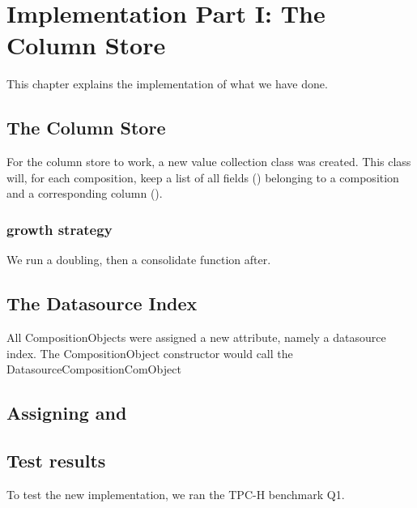 \chapter{Implementation Part I: The Column Store}
\label{chap:Implementation Part I: The Column Store}

This chapter explains the implementation of what we have done.

\section{The Column Store}
\label{sec:The CompositionComObjValueCollection}
For the column store to work, a new value collection class was created. This class will, for each composition, keep a list of all fields () belonging to a composition and a corresponding column ().

\subsection{ growth strategy}
\label{sub:FieldValueCollection growth strategy}
We run a doubling, then a consolidate function after.



\section{The Datasource Index}
\label{sec:The Datasource Index}
All CompositionObjects were assigned a new attribute, namely a datasource index. The CompositionObject constructor would call the DatasourceCompositionComObject



\section{Assigning and }
\label{sec:Assigning and }

\section{Test results}
\label{sec:Test results}
To test the new implementation, we ran the TPC-H benchmark Q1.

